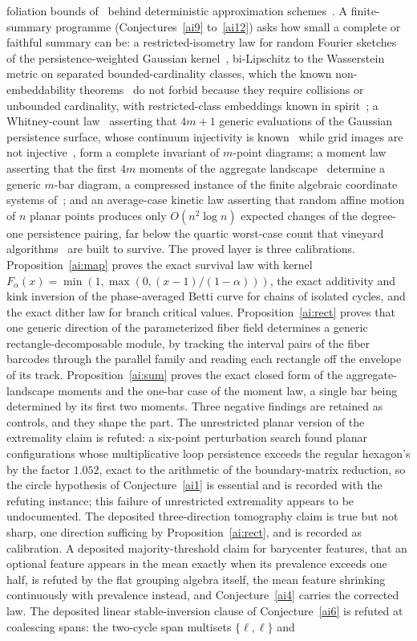 \documentclass[11pt]{article}
\theoremstyle{definition}
\begin{document}
foliation bounds of~\cite{CDFFL13} behind deterministic approximation schemes~\cite{KN20,BHLMS23}.  A finite-summary programme (Conjectures~\ref{ai9} to~\ref{ai12}) asks how small a complete or faithful summary can be: a restricted-isometry law for random Fourier sketches~\cite{RR07} of the persistence-weighted Gaussian kernel~\cite{KFH16}, bi-Lipschitz to the Wasserstein metric on separated bounded-cardinality classes, which the known non-embeddability theorems~\cite{CB19,BW20} do not forbid because they require collisions or unbounded cardinality, with restricted-class embeddings known in spirit~\cite{MV24}; a Whitney-count law~\cite{Whi44} asserting that $4m+1$ generic evaluations of the Gaussian persistence surface, whose continuum injectivity is known~\cite{CHLP22} while grid images are not injective~\cite{AEK17}, form a complete invariant of $m$-point diagrams; a moment law asserting that the first $4m$ moments of the aggregate landscape~\cite{Bub15} determine a generic $m$-bar diagram, a compressed instance of the finite algebraic coordinate systems of~\cite{ACC16,Kal19}; and an average-case kinetic law asserting that random affine motion of $n$ planar points produces only $O(n^2\log n)$ expected changes of the degree-one persistence pairing, far below the quartic worst-case count that vineyard algorithms~\cite{CEM06,DH21,Hic22,GM26} are built to survive.  The proved layer is three calibrations.  Proposition~\ref{ai:map} proves the exact survival law with kernel $F_\alpha(x)=\min(1,\max(0,(x-1)/(1-\alpha)))$, the exact additivity and kink inversion of the phase-averaged Betti curve for chains of isolated cycles, and the exact dither law for branch critical values.  Proposition~\ref{ai:rect} proves that one generic direction of the parameterized fiber field determines a generic rectangle-decomposable module, by tracking the interval pairs of the fiber barcodes through the parallel family and reading each rectangle off the envelope of its track.  Proposition~\ref{ai:sum} proves the exact closed form of the aggregate-landscape moments and the one-bar case of the moment law, a single bar being determined by its first two moments.  Three negative findings are retained as controls, and they shape the part.  The unrestricted planar version of the extremality claim is refuted: a six-point perturbation search found planar configurations whose multiplicative loop persistence exceeds the regular hexagon's by the factor $1.052$, exact to the arithmetic of the boundary-matrix reduction, so the circle hypothesis of Conjecture~\ref{ai1} is essential and is recorded with the refuting instance; this failure of unrestricted extremality appears to be undocumented.  The deposited three-direction tomography claim is true but not sharp, one direction sufficing by Proposition~\ref{ai:rect}, and is recorded as calibration.  A deposited majority-threshold claim for barycenter features, that an optional feature appears in the mean exactly when its prevalence exceeds one half, is refuted by the flat grouping algebra itself, the mean feature shrinking continuously with prevalence instead, and Conjecture~\ref{ai4} carries the corrected law.  The deposited linear stable-inversion clause of Conjecture~\ref{ai6} is refuted at coalescing spans: the two-cycle span multisets $\{\ell,\ell\}$ and 
\end{document}
